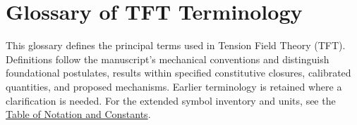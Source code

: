 
\chapter*{Glossary of TFT Terminology}
{}
\label{app:glossary}

This glossary defines the principal terms used in Tension Field Theory (TFT).
Definitions follow the manuscript's mechanical conventions and distinguish
foundational postulates, results within specified constitutive closures,
calibrated quantities, and proposed mechanisms. Earlier terminology is
retained where a clarification is needed. For the extended symbol inventory
and units, see the \hyperref[app:notation]{Table of Notation and Constants}.

